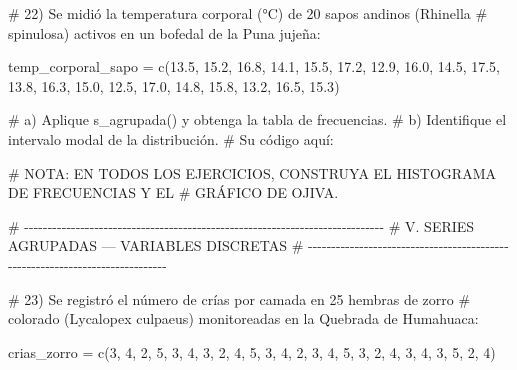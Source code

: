 \documentclass[
  spanish,
  letterpaper,
  DIV=11,
  numbers=noendperiod]{scrreprt}
\newenvironment{Shaded}{\begin{snugshade}}{\end{snugshade}}
\newcommand{\CommentTok}[1]{\textcolor[rgb]{0.37,0.37,0.37}{#1}}
\newcommand{\DecValTok}[1]{\textcolor[rgb]{0.68,0.00,0.00}{#1}}
\newcommand{\FloatTok}[1]{\textcolor[rgb]{0.68,0.00,0.00}{#1}}
\newcommand{\FunctionTok}[1]{\textcolor[rgb]{0.28,0.35,0.67}{#1}}
\newcommand{\NormalTok}[1]{\textcolor[rgb]{0.00,0.23,0.31}{#1}}
\newcommand{\OtherTok}[1]{\textcolor[rgb]{0.00,0.23,0.31}{#1}}
\begin{document}
\begin{Shaded}
\begin{Highlighting}[]
\CommentTok{\# 22) Se midió la temperatura corporal (°C) de 20 sapos andinos (Rhinella}
\CommentTok{\#     spinulosa) activos en un bofedal de la Puna jujeña:}

\NormalTok{temp\_corporal\_sapo }\OtherTok{=} \FunctionTok{c}\NormalTok{(}\FloatTok{13.5}\NormalTok{, }\FloatTok{15.2}\NormalTok{, }\FloatTok{16.8}\NormalTok{, }\FloatTok{14.1}\NormalTok{, }\FloatTok{15.5}\NormalTok{, }\FloatTok{17.2}\NormalTok{, }\FloatTok{12.9}\NormalTok{, }\FloatTok{16.0}\NormalTok{, }\FloatTok{14.5}\NormalTok{, }\FloatTok{17.5}\NormalTok{,}
                        \FloatTok{13.8}\NormalTok{, }\FloatTok{16.3}\NormalTok{, }\FloatTok{15.0}\NormalTok{, }\FloatTok{12.5}\NormalTok{, }\FloatTok{17.0}\NormalTok{, }\FloatTok{14.8}\NormalTok{, }\FloatTok{15.8}\NormalTok{, }\FloatTok{13.2}\NormalTok{, }\FloatTok{16.5}\NormalTok{, }\FloatTok{15.3}\NormalTok{)}

\CommentTok{\#     a) Aplique s\_agrupada() y obtenga la tabla de frecuencias.}
\CommentTok{\#     b) Identifique el intervalo modal de la distribución.}
\CommentTok{\# Su código aquí:}


\CommentTok{\# NOTA: EN TODOS LOS EJERCICIOS, CONSTRUYA EL HISTOGRAMA DE FRECUENCIAS Y EL }
\CommentTok{\# GRÁFICO DE OJIVA.}

\CommentTok{\# {-}{-}{-}{-}{-}{-}{-}{-}{-}{-}{-}{-}{-}{-}{-}{-}{-}{-}{-}{-}{-}{-}{-}{-}{-}{-}{-}{-}{-}{-}{-}{-}{-}{-}{-}{-}{-}{-}{-}{-}{-}{-}{-}{-}{-}{-}{-}{-}{-}{-}{-}{-}{-}{-}{-}{-}{-}{-}{-}{-}{-}{-}{-}{-}{-}{-}{-}{-}{-}{-}{-}{-}{-}{-}{-}{-}{-}}
\CommentTok{\# V. SERIES AGRUPADAS — VARIABLES DISCRETAS}
\CommentTok{\# {-}{-}{-}{-}{-}{-}{-}{-}{-}{-}{-}{-}{-}{-}{-}{-}{-}{-}{-}{-}{-}{-}{-}{-}{-}{-}{-}{-}{-}{-}{-}{-}{-}{-}{-}{-}{-}{-}{-}{-}{-}{-}{-}{-}{-}{-}{-}{-}{-}{-}{-}{-}{-}{-}{-}{-}{-}{-}{-}{-}{-}{-}{-}{-}{-}{-}{-}{-}{-}{-}{-}{-}{-}{-}{-}{-}{-}}

\CommentTok{\# 23) Se registró el número de crías por camada en 25 hembras de zorro}
\CommentTok{\#     colorado (Lycalopex culpaeus) monitoreadas en la Quebrada de Humahuaca:}

\NormalTok{crias\_zorro }\OtherTok{=} \FunctionTok{c}\NormalTok{(}\DecValTok{3}\NormalTok{, }\DecValTok{4}\NormalTok{, }\DecValTok{2}\NormalTok{, }\DecValTok{5}\NormalTok{, }\DecValTok{3}\NormalTok{, }\DecValTok{4}\NormalTok{, }\DecValTok{3}\NormalTok{, }\DecValTok{2}\NormalTok{, }\DecValTok{4}\NormalTok{, }\DecValTok{5}\NormalTok{,}
                 \DecValTok{3}\NormalTok{, }\DecValTok{4}\NormalTok{, }\DecValTok{2}\NormalTok{, }\DecValTok{3}\NormalTok{, }\DecValTok{4}\NormalTok{, }\DecValTok{5}\NormalTok{, }\DecValTok{3}\NormalTok{, }\DecValTok{2}\NormalTok{, }\DecValTok{4}\NormalTok{, }\DecValTok{3}\NormalTok{,}
                 \DecValTok{4}\NormalTok{, }\DecValTok{3}\NormalTok{, }\DecValTok{5}\NormalTok{, }\DecValTok{2}\NormalTok{, }\DecValTok{4}\NormalTok{)}


\end{Highlighting}
\end{Shaded}
\end{document}
